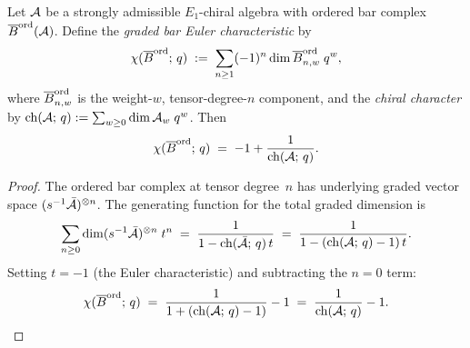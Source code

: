 \begin{theorem}
\label{thm:euler-eta-identity}
Let $\mathcal{A}$ be a strongly admissible $E_1$-chiral algebra with
ordered bar complex $\overline{B}^{\mathrm{ord}}(\mathcal{A})$. Define
the \emph{graded bar Euler characteristic} by
\[
\chi(\overline{B}^{\mathrm{ord}};\,q)
\;:=\;
\sum_{n\ge 1}(-1)^n\dim \overline{B}^{\mathrm{ord}}_{n,w}\;q^w,
\]
where $\overline{B}^{\mathrm{ord}}_{n,w}$ is the weight-$w$,
tensor-degree-$n$ component, and the \emph{chiral character}
by $\operatorname{ch}(\mathcal{A};\,q):=\sum_{w\ge 0}\dim\mathcal{A}_w\;q^w$.
Then
\begin{equation}\label{eq:euler-eta-master}
\chi(\overline{B}^{\mathrm{ord}};\,q)
\;=\;
-1+\frac{1}{\operatorname{ch}(\mathcal{A};\,q)}.
\end{equation}
\end{theorem}

\begin{proof}
The ordered bar complex at tensor degree~$n$ has underlying
graded vector space $(s^{-1}\bar{\mathcal{A}})^{\otimes n}$. The
generating function for the total graded dimension is
\[
\sum_{n\ge 0}
\dim(s^{-1}\bar{\mathcal{A}})^{\otimes n}\;t^n
\;=\;
\frac{1}{1-\operatorname{ch}(\bar{\mathcal{A}};\,q)\,t}
\;=\;
\frac{1}{1-(\operatorname{ch}(\mathcal{A};\,q)-1)\,t}.
\]
Setting $t=-1$ (the Euler characteristic) and subtracting
the $n=0$ term:
\[
\chi(\overline{B}^{\mathrm{ord}};\,q)
\;=\;
\frac{1}{1+(\operatorname{ch}(\mathcal{A};\,q)-1)}-1
\;=\;
\frac{1}{\operatorname{ch}(\mathcal{A};\,q)}-1.
\qedhere
\]
\end{proof}

